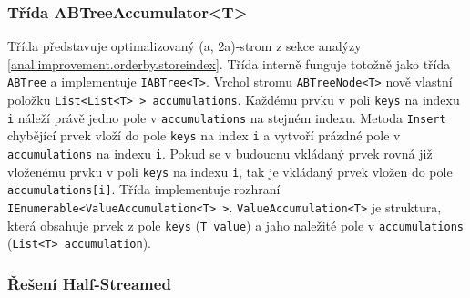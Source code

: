 \subsubsection{Třída ABTreeAccumulator<T>}

Třída představuje optimalizovaný (a, 2a)-strom z sekce analýzy \ref{anal.improvement.orderby.storeindex}.
Třída interně funguje totožně jako třída \texttt{ABTree} a implementuje \texttt{IABTree<T>}.
Vrchol stromu \texttt{ABTreeNode<T>} nově vlastní položku \texttt{List<List<T> > accumulations}.
Každému prvku v poli \texttt{keys} na indexu \texttt{i} náleží právě jedno pole v \texttt{accumulations} na stejném indexu.
Metoda \texttt{Insert} chybějící prvek vloží do pole \texttt{keys} na index \texttt{i} a vytvoří prázdné pole v \texttt{accumulations} na indexu \texttt{i}.
Pokud se v budoucnu vkládaný prvek rovná již vloženému prvku v poli \texttt{keys} na indexu \texttt{i}, tak je vkládaný prvek vložen do pole \texttt{accumulations[i]}.
Třída implementuje rozhraní \texttt{IEnumerable<ValueAccumulation<T> >}.
\texttt{ValueAccumulation<T>} je struktura, která obsahuje prvek z pole \texttt{keys} (\texttt{T value}) a jaho naležité pole v \texttt{accumulations} (\texttt{List<T> accumulation}).

\subsubsection{Řešení Half-Streamed}

